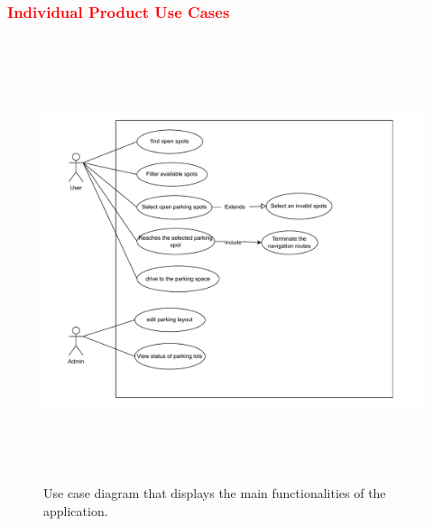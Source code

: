 \documentclass[12pt,letterpaper]{article}
\begin{document}
\subsubsection{\textcolor{red}{Individual Product Use Cases}}
\begin{figure}[H]
    \centering
    \includegraphics[width=13cm, height=13cm]{use_case.pdf}
    \caption{Use case diagram that displays the main functionalities of the application.}
\end{figure}
\end{document}
